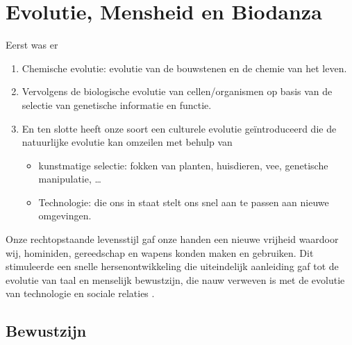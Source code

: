 \documentclass[
  11pt,
]{book}
\providecommand{\tightlist}{%
  \setlength{\itemsep}{0pt}\setlength{\parskip}{0pt}}
\begin{document}
\section{Evolutie, Mensheid en Biodanza}\label{evolutie-mensheid-en-biodanza}

Eerst was er

\begin{enumerate}
\def\labelenumi{\arabic{enumi}.}
\item
  Chemische evolutie: evolutie van de bouwstenen en de chemie van het leven.
\item
  Vervolgens de biologische evolutie van cellen/organismen op basis van de selectie van genetische informatie en functie.
\item
  En ten slotte heeft onze soort een culturele evolutie geïntroduceerd die de natuurlijke evolutie kan omzeilen met behulp van

  \begin{itemize}
  \tightlist
  \item
    kunstmatige selectie: fokken van planten, huisdieren, vee, genetische manipulatie, \ldots{}
  \item
    Technologie: die ons in staat stelt ons snel aan te passen aan nieuwe omgevingen.
  \end{itemize}
\end{enumerate}

Onze rechtopstaande levensstijl gaf onze handen een nieuwe vrijheid waardoor wij, hominiden, gereedschap en wapens konden maken en gebruiken. Dit stimuleerde een snelle hersenontwikkeling die uiteindelijk aanleiding gaf tot de evolutie van taal en menselijk bewustzijn, die nauw verweven is met de evolutie van technologie en sociale relaties \citep{capraLuisi2014}.

\subsection{Bewustzijn}\label{bewustzijn}
\end{document}
